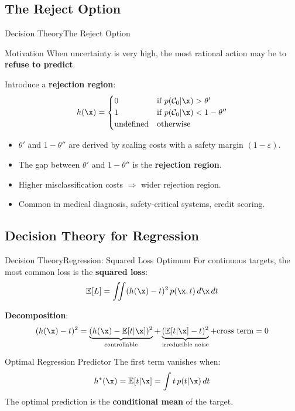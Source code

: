 \subsection{The Reject Option}

\begin{frame}{Decision Theory}{The Reject Option}
  \begin{block}{Motivation}
    When uncertainty is very high, the most rational action may be to \textbf{refuse to predict}.
  \end{block}

  Introduce a \textbf{rejection region}: 
  \[
    h(\x) = \begin{cases}
      0 & \text{if } p(\mathcal{C}_0|\x) > \theta' \\
      1 & \text{if } p(\mathcal{C}_0|\x) < 1-\theta'' \\
      \text{undefined} & \text{otherwise}
    \end{cases}
  \]

  \begin{itemize}
    \item $\theta'$ and $1-\theta''$ are derived by scaling costs with a safety margin $(1-\varepsilon)$.
    \item The gap between $\theta'$ and $1-\theta''$ is the \textbf{rejection region}.
    \item Higher misclassification costs $\Rightarrow$ wider rejection region.
    \item Common in medical diagnosis, safety-critical systems, credit scoring.
  \end{itemize}
\end{frame}

\subsection{Decision Theory for Regression}

\begin{frame}{Decision Theory}{Regression: Squared Loss Optimum}
  For continuous targets, the most common loss is the \textbf{squared loss}:
  \[
    \mathbb{E}[L] = \iint (h(\x) - t)^2\,p(\x,t)\,d\x\,dt
  \]

  \textbf{Decomposition}:
  \[
    (h(\x) - t)^2 = \underbrace{(h(\x)-\mathbb{E}[t|\x])^2}_{\text{controllable}} + \underbrace{(\mathbb{E}[t|\x]-t)^2}_{\text{irreducible noise}} + \text{cross term} = 0
  \]

  \begin{block}{Optimal Regression Predictor}
    The first term vanishes when:
    \[
      h^*(\x) = \mathbb{E}[t|\x] = \int t\,p(t|\x)\,dt
    \]
    The optimal prediction is the \textbf{conditional mean} of the target.
  \end{block}
\end{frame}

